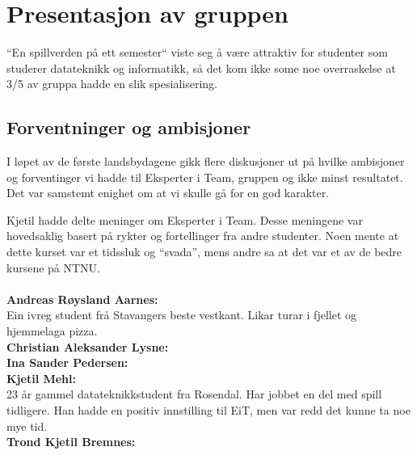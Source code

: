\section{Presentasjon av gruppen}
``En spillverden på ett semester`` viste seg å være attraktiv for
studenter som studerer datateknikk og informatikk, så det kom ikke some
noe overraskelse at 3/5 av gruppa hadde en slik spesialisering.

\subsection{Forventninger og ambisjoner}
I løpet av de første landsbydagene gikk flere diskusjoner ut på hvilke
ambisjoner og forventinger vi hadde til Eksperter i Team, gruppen og
ikke minst resultatet. Det var samstemt enighet om at vi skulle gå for
en god karakter.

Kjetil hadde delte meninger om Eksperter i Team. Desse meningene var
hovedsaklig basert på rykter og fortellinger fra andre studenter. Noen
mente at dette kurset var et tidssluk og ``svada'', mens andre sa at det
var et av de bedre kursene på NTNU.
\\
\\
\textbf{Andreas Røysland Aarnes:}\\
Ein ivreg student frå Stavangers beste vestkant. Likar turar i fjellet
og hjemmelaga pizza.\\
\textbf{Christian Aleksander Lysne:}\\
\textbf{Ina Sander Pedersen:}\\
\textbf{Kjetil Mehl:}\\
23 år gammel datateknikkstudent fra Rosendal. Har jobbet en del med
spill tidligere. Han hadde en positiv innstilling til EiT, men var
redd det kunne ta noe mye tid.\\
\textbf{Trond Kjetil Bremnes:}\\
